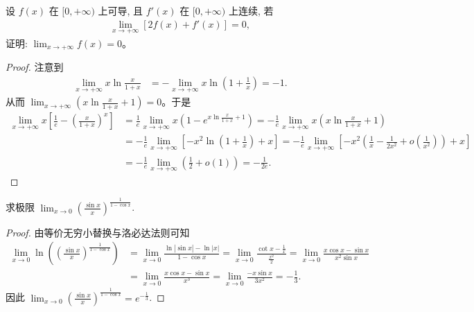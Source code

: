 \documentclass[../../main.tex]{subfiles}%
\begin{document}
\begin{example}
设 $f(x)$ 在 $[0, +\infty)$ 上可导, 且 $f'(x)$ 在 $[0, +\infty)$ 上连续, 若
\begin{align*}
\lim_{x \to +\infty} [2f(x) + f'(x)] = 0,
\end{align*}
证明: $\lim_{x \to +\infty} f(x) = 0$。
\end{example}
\begin{proof}
注意到
\begin{align*}
\lim_{x \to +\infty} x \ln \frac{x}{1 + x} &= -\lim_{x \to +\infty} x \ln \left( 1 + \frac{1}{x} \right) = -1.
\end{align*}
从而 $\lim_{x \to +\infty} \left( x \ln \frac{x}{1 + x} + 1 \right) = 0$。于是
\begin{align*}
\lim_{x \to +\infty} x \left[ \frac{1}{e} - \left( \frac{x}{1 + x} \right)^x \right] &= \frac{1}{e} \lim_{x \to +\infty} x \left( 1 - e^{x \ln \frac{x}{1 + x} + 1} \right) = -\frac{1}{e} \lim_{x \to +\infty} x \left( x \ln \frac{x}{1 + x} + 1 \right) \\
&= -\frac{1}{e} \lim_{x \to +\infty} \left[ -x^2 \ln \left( 1 + \frac{1}{x} \right) + x \right] = -\frac{1}{e} \lim_{x \to +\infty} \left[ -x^2 \left( \frac{1}{x} - \frac{1}{2x^2} + o\left( \frac{1}{x^2} \right) \right) + x \right] \\
&= -\frac{1}{e} \lim_{x \to +\infty} \left( \frac{1}{2} + o\left( 1 \right) \right) = -\frac{1}{2e}.
\end{align*}
\end{proof}

\begin{example}
求极限 $\lim_{x \to 0} \left( \frac{\sin x}{x} \right)^{\frac{1}{1 - \cos x}}$.
\end{example}
\begin{proof}
由等价无穷小替换与洛必达法则可知
\begin{align*}
\lim_{x \to 0} \ln \left( \left( \frac{\sin x}{x} \right)^{\frac{1}{1 - \cos x}} \right) &= \lim_{x \to 0} \frac{\ln \left| \sin x \right| - \ln \left| x \right|}{1 - \cos x} = \lim_{x \to 0} \frac{\cot x - \frac{1}{x}}{\frac{x^2}{2}} = \lim_{x \to 0} \frac{x \cos x - \sin x}{x^2 \sin x} \\
&= \lim_{x \to 0} \frac{x \cos x - \sin x}{x^3} = \lim_{x \to 0} \frac{-x \sin x}{3x^2} = -\frac{1}{3}.
\end{align*}
因此 $\lim_{x \to 0} \left( \frac{\sin x}{x} \right)^{\frac{1}{1 - \cos x}} = e^{-\frac{1}{3}}$.
\end{proof}
\end{document}
